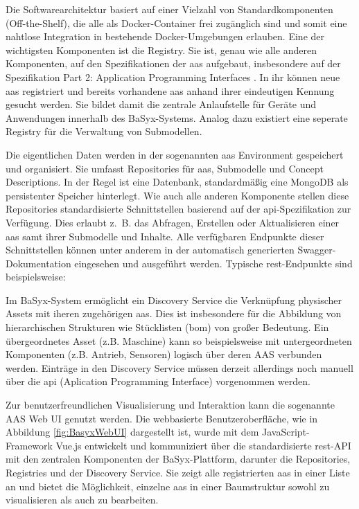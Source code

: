 Die Softwarearchitektur basiert auf einer Vielzahl von Standardkomponenten (Off-the-Shelf), die alle als Docker-Container frei zugänglich sind und somit eine nahtlose Integration in bestehende Docker-Umgebungen erlauben.
Eine der wichtigsten Komponenten ist die Registry. 
Sie ist, genau wie alle anderen Komponenten, auf den Spezifikationen der \acs{aas} aufgebaut, insbesondere auf der Spezifikation Part 2: Application Programming Interfaces \cite{SpezifikationPart2}.
In ihr können neue \acs{aas} registriert und bereits vorhandene \acs{aas} anhand ihrer eindeutigen Kennung gesucht werden.
Sie bildet damit die zentrale Anlaufstelle für Geräte und Anwendungen innerhalb des BaSyx-Systems.
Analog dazu existiert eine seperate Registry für die Verwaltung von Submodellen.

Die eigentlichen Daten werden in der sogenannten \acs{aas} Environment gespeichert und organisiert.
Sie umfasst Repositories für \acs{aas}, Submodelle und Concept Descriptions.
In der Regel ist eine Datenbank, standardmäßig eine MongoDB als persistenter Speicher hinterlegt.
Wie auch alle anderen Komponente stellen diese Repositories standardisierte Schnittstellen basierend auf der \acs{api}-Spezifikation zur Verfügung.
Dies erlaubt z.~B. das Abfragen, Erstellen oder Aktualisieren einer \acs{aas} samt ihrer Submodelle und Inhalte.
Alle verfügbaren Endpunkte dieser Schnittstellen können unter anderem in der automatisch generierten Swagger-Dokumentation eingesehen und ausgeführt werden. 
Typische \acs{rest}-Endpunkte sind beispielsweise:



Im BaSyx-System ermöglicht ein Discovery Service die Verknüpfung physischer Assets mit iheren zugehörigen \acs{aas}.
Dies ist insbesondere für die Abbildung von hierarchischen Strukturen wie Stücklisten (\ac{bom}) von großer Bedeutung.
Ein übergeordnetes Asset (z.B. Maschine) kann so beispielsweise mit untergeordneten Komponenten (z.B. Antrieb, Sensoren) logisch über deren AAS verbunden werden.
Einträge in den Discovery Service müssen derzeit allerdings noch manuell über die \acs{api} (Aplication Programming Interface) vorgenommen werden.

Zur benutzerfreundlichen Visualisierung und Interaktion kann die sogenannte AAS Web UI genutzt werden.
Die webbasierte Benutzeroberfläche, wie in Abbildung \ref{fig:BasyxWebUI} dargestellt ist, wurde mit dem JavaScript-Framework Vue.js entwickelt und kommuniziert über die standardisierte \acs{rest}-API mit den zentralen Komponenten der BaSyx-Plattform, darunter die Repositories, Registries und der Discovery Service.
Sie zeigt alle registrierten \acs{aas} in einer Liste an und bietet die Möglichkeit, einzelne \acs{aas} in einer Baumstruktur sowohl zu visualisieren als auch zu bearbeiten. 

